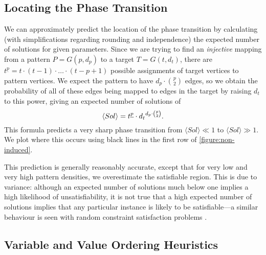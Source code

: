 \documentclass[letterpaper]{article}
\begin{document}
\subsection{Locating the Phase Transition}

We can approximately predict the location of the phase transition by calculating (with
simplifications regarding rounding and independence) the expected number of solutions for given
parameters. Since we are trying to find an \emph{injective} mapping from a pattern $P = G(p, d_p)$
to a target $T = G(t, d_t)$, there are $t^{\underline{p}} = t \cdot (t - 1) \cdot \ldots \cdot (t -
p + 1)$ possible assignments of target vertices to pattern vertices.  We expect the pattern to have
$d_p \cdot \binom{p}{2}$ edges, so we obtain the probability of all of these edges being mapped to
edges in the target by raising $d_t$ to this power, giving an expected number of solutions of \[
\langle Sol \rangle = t^{\underline{p}} \cdot {d_t}^{d_p \cdot \binom{p}{2}} \textnormal{.} \] This
formula predicts a very sharp phase transition from $\langle Sol \rangle \ll 1$ to $\langle Sol
\rangle \gg 1$. We plot where this occurs using black lines in the first row of
\cref{figure:non-induced}.

This prediction is generally reasonably accurate, except that for very low and very high pattern
densities, we overestimate the satisfiable region. This is due to variance: although an expected
number of solutions much below one implies a high likelihood of unsatisfiability, it is not true
that a high expected number of solutions implies that any particular instance is likely to be
satisfiable---a similar behaviour is seen with random constraint satisfaction problems
\citep{Smith:1994,Smith:1996}.

\subsection{Variable and Value Ordering Heuristics}
\end{document}
